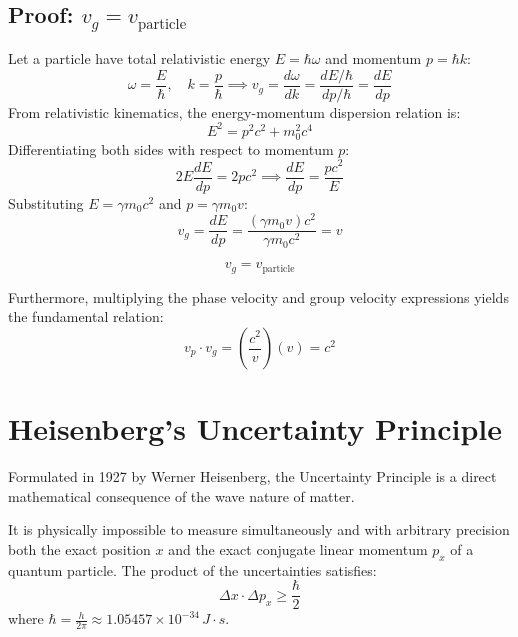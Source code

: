 \subsection{Proof: \texorpdfstring{$v_g = v_{\text{particle}}$}{vg = v(particle)}}
Let a particle have total relativistic energy $E = \hbar\omega$ and momentum $p = \hbar k$:
\begin{equation}
    \omega = \frac{E}{\hbar}, \quad k = \frac{p}{\hbar} \implies v_g = \frac{d\omega}{dk} = \frac{dE/\hbar}{dp/\hbar} = \frac{dE}{dp}
\end{equation}
From relativistic kinematics, the energy-momentum dispersion relation is:
\begin{equation}
    E^2 = p^2 c^2 + m_0^2 c^4
\end{equation}
Differentiating both sides with respect to momentum $p$:
\begin{equation}
    2E \frac{dE}{dp} = 2p c^2 \implies \frac{dE}{dp} = \frac{p c^2}{E}
\end{equation}
Substituting $E = \gamma m_0 c^2$ and $p = \gamma m_0 v$:
\begin{equation}
    v_g = \frac{dE}{dp} = \frac{(\gamma m_0 v) c^2}{\gamma m_0 c^2} = v
\end{equation}

\begin{keyequation}
\begin{equation}
    v_g = v_{\text{particle}}
\end{equation}
\end{keyequation}
Furthermore, multiplying the phase velocity and group velocity expressions yields the fundamental relation:
\begin{equation}
    v_p \cdot v_g = \left(\frac{c^2}{v}\right)(v) = c^2
\end{equation}

\section{Heisenberg's Uncertainty Principle}

Formulated in 1927 by Werner Heisenberg, the Uncertainty Principle is a direct mathematical consequence of the wave nature of matter.

\begin{definition}
It is physically impossible to measure simultaneously and with arbitrary precision both the exact position $x$ and the exact conjugate linear momentum $p_x$ of a quantum particle. The product of the uncertainties satisfies:
\begin{equation}
    \Delta x \cdot \Delta p_x \ge \frac{\hbar}{2}
\end{equation}
where $\hbar = \frac{h}{2\pi} \approx 1.05457 \times 10^{-34}\,\si{J\cdot s}$.
\end{definition}

